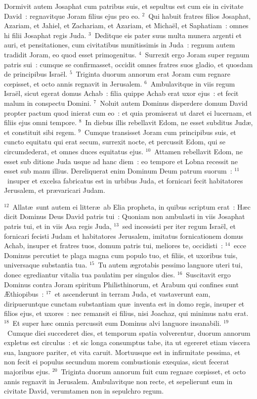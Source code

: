 \bchapter
\lettrine[lines=3,image=true,loversize=0.05,lraise=-0.03]{D}{}ormivit autem Josaphat cum patribus suis, et sepultus est cum eis in civitate David~: regnavitque Joram filius ejus pro eo.
${}^{2}$~Qui habuit fratres filios Josaphat, Azariam, et Jahiel, et Zachariam, et Azariam, et Micha\"el, et Saphatiam~: omnes hi filii Josaphat regis Juda.
${}^{3}$~Deditque eis pater suus multa munera argenti et auri, et pensitationes, cum civitatibus munitissimis in Juda~: regnum autem tradidit Joram, eo quod esset primogenitus.
${}^{4}$~Surrexit ergo Joram super regnum patris sui~: cumque se confirmasset, occidit omnes fratres suos gladio, et quosdam de principibus Isra\"el.
${}^{5}$~Triginta duorum annorum erat Joram cum regnare cœpisset, et octo annis regnavit in Jerusalem.
${}^{6}$~Ambulavitque in viis regum Isra\"el, sicut egerat domus Achab~: filia quippe Achab erat uxor ejus~: et fecit malum in conspectu Domini.
${}^{7}$~Noluit autem Dominus disperdere domum David propter pactum quod inierat cum eo~: et quia promiserat ut daret ei lucernam, et filiis ejus omni tempore.
${}^{8}$~In diebus illis rebellavit Edom, ne esset subditus Jud\ae , et constituit sibi regem.
${}^{9}$~Cumque transisset Joram cum principibus suis, et cuncto equitatu qui erat secum, surrexit nocte, et percussit Edom, qui se circumdederat, et omnes duces equitatus ejus.
${}^{10}$~Attamen rebellavit Edom, ne esset sub ditione Juda usque ad hanc diem~: eo tempore et Lobna recessit ne esset sub manu illius. Dereliquerat enim Dominum Deum patrum suorum~:
${}^{11}$~insuper et excelsa fabricatus est in urbibus Juda, et fornicari fecit habitatores Jerusalem, et pr\ae varicari Judam.


${}^{12}$~Allat\ae\ sunt autem ei litter\ae\ ab Elia propheta, in quibus scriptum erat~: H\ae c dicit Dominus Deus David patris tui~: Quoniam non ambulasti in viis Josaphat patris tui, et in viis Asa regis Juda,
${}^{13}$~sed incessisti per iter regum Isra\"el, et fornicari fecisti Judam et habitatores Jerusalem, imitatus fornicationem domus Achab, insuper et fratres tuos, domum patris tui, meliores te, occidisti~:
${}^{14}$~ecce Dominus percutiet te plaga magna cum populo tuo, et filiis, et uxoribus tuis, universaque substantia tua.
${}^{15}$~Tu autem \ae grotabis pessimo languore uteri tui, donec egrediantur vitalia tua paulatim per singulos dies.
${}^{16}$~Suscitavit ergo Dominus contra Joram spiritum Philisthinorum, et Arabum qui confines sunt \AE thiopibus~:
${}^{17}$~et ascenderunt in terram Juda, et vastaverunt eam, diripueruntque cunctam substantiam qu\ae\ inventa est in domo regis, insuper et filios ejus, et uxores~: nec remansit ei filius, nisi Joachaz, qui minimus natu erat.
${}^{18}$~Et super h\ae c omnia percussit eum Dominus alvi languore insanabili.
${}^{19}$~Cumque diei succederet dies, et temporum spatia volverentur, duorum annorum expletus est circulus~: et sic longa consumptus tabe, ita ut egereret etiam viscera sua, languore pariter, et vita caruit. Mortuusque est in infirmitate pessima, et non fecit ei populus secundum morem combustionis exequias, sicut fecerat majoribus ejus.
${}^{20}$~Triginta duorum annorum fuit cum regnare cœpisset, et octo annis regnavit in Jerusalem. Ambulavitque non recte, et sepelierunt eum in civitate David, verumtamen non in sepulchro regum.

